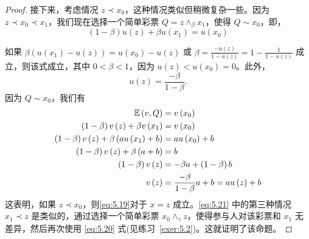 \begin{proof}
接下来，考虑情况 \(z \prec  {x}_{0}\)，这种情况类似但稍微复杂一些。因为 \(z \prec  {x}_{0} \prec  {x}_{1}\)，我们现在选择一个简单彩票 \(Q = z{ \land  }_{\beta }{x}_{1}\)，使得 \(Q \sim  {x}_{0}\)，即，
\[
\left( {1 - \beta }\right) u\left( z\right)  + {\beta u}\left( {x}_{1}\right)  = u\left( {x}_{0}\right)
\]

如果 \(\beta \left( {u\left( {x}_{1}\right)  - u\left( z\right) }\right)  = u\left( {x}_{0}\right)  - u\left( z\right)\) 或 \(\beta  = \frac{-u\left( z\right) }{1 - u\left( z\right) } = 1 - \frac{1}{1 - u\left( z\right) }\) 成立，则该式成立，其中 \(0 < \beta  < 1\)，因为 \(u\left( z\right)  < u\left( {x}_{0}\right)  = 0\)。此外，
\begin{equation}
\label{eq:5.22}
u\left( z\right)  = \frac{-\beta }{1 - \beta }.
\end{equation}
因为 \(Q \sim  {x}_{0}\)，我们有
\begin{align}
\mathbb{E}\left( {v,Q}\right)  &= v\left( {x}_{0}\right) \notag \\
\left( {1 - \beta }\right) v\left( z\right)  + {\beta v}\left( {x}_{1}\right)  &= v\left( {x}_{0}\right) \notag \\
\left( {1 - \beta }\right) v\left( z\right)  + \beta \left( {{au}\left( {x}_{1}\right)  + b}\right)  &= {au}\left( {x}_{0}\right)  + b \notag \\
\left( {1 - \beta }\right) v\left( z\right)  + \beta \left( {a + b}\right)  &= b \notag \\
\left( {1 - \beta }\right) v\left( z\right)  &=  - {\beta a} + \left( {1 - \beta }\right) b \notag \\
v\left( z\right)  &= \frac{-\beta }{1 - \beta }a + b = {au}\left( z\right)  + b \label{eq:5.23}
\end{align}
这表明，如果 \(z \prec  {x}_{0}\)，则\eqref{eq:5.19}对于 \(x = z\) 成立。\eqref{eq:5.21} 中的第三种情况 \({x}_{1} \prec  z\) 是类似的，通过选择一个简单彩票 \({x}_{0}{ \land  }_{\gamma }z\)，使得参与人对该彩票和 \({x}_{1}\) 无差异，然后再次使用 \eqref{eq:5.20} 式(见练习~\ref{exer:5.2})。这就证明了该命题。
\end{proof}

\bigskip

